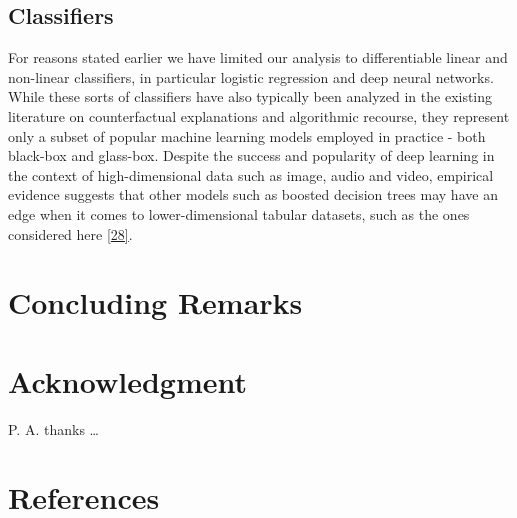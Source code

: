 \documentclass[
  conference]{IEEEtran}
\begin{document}
\hypertarget{classifiers}{%
\subsection{Classifiers}\label{classifiers}}

For reasons stated earlier we have limited our analysis to
differentiable linear and non-linear classifiers, in particular logistic
regression and deep neural networks. While these sorts of classifiers
have also typically been analyzed in the existing literature on
counterfactual explanations and algorithmic recourse, they represent
only a subset of popular machine learning models employed in practice -
both black-box and glass-box. Despite the success and popularity of deep
learning in the context of high-dimensional data such as image, audio
and video, empirical evidence suggests that other models such as boosted
decision trees may have an edge when it comes to lower-dimensional
tabular datasets, such as the ones considered here
\protect\hyperlink{ref-grinsztajn2022tree}{{[}28{]}}.

\hypertarget{sec-conclusion}{%
\section{Concluding Remarks}\label{sec-conclusion}}

\hypertarget{acknowledgment}{%
\section*{Acknowledgment}\label{acknowledgment}}

P. A. thanks \ldots{}

\pagebreak
\FloatBarrier

\hypertarget{references}{%
\section*{References}\label{references}}
\end{document}
